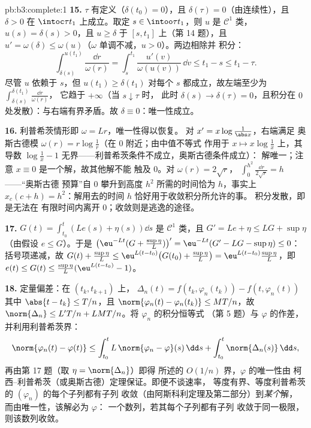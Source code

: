 \begin{solution}{pb:b3:complete:1}
\textbf{15.} $\tau$ 有定义（$\delta(t_0) = 0$），且
$\delta(\tau) = 0$（由连续性），且 $\delta > 0$ 在
$\intoc\tau{t_1}$ 上成立。取定 $s \in \intoo\tau{t_1}$，则 $u$
是 $\mathcal C^1$ 类，$u(s) = \delta(s) > 0$，且 $u \geq \delta$ 于
$[s, t_1]$ 上（第 14 题），且 $u' = \omega(\delta) \leq
\omega(u)$（$\omega$ 单调不减，$u > 0$）。两边相除并
积分：
\[
\int_{\delta(s)}^{u(t_1)}\frac{\dd r}{\omega(r)}
= \int_s^{t_1}\frac{u'(v)}{\omega(u(v))}\,\dd v \leq t_1 - s
\leq t_1 - \tau .
\]
尽管 $u$ 依赖于 $s$，但 $u(t_1) \geq
\delta(t_1)$ 对每个 $s$ 都成立，故左端至少为
$\int_{\delta(s)}^{\delta(t_1)}\frac{\dd r}{\omega(r)}$，
它趋于 $+\infty$（当 $s \downarrow \tau$ 时，
此时 $\delta(s) \to \delta(\tau) = 0$，且积分在
$0$ 处发散）：与右端有界矛盾。故
$\delta \equiv 0$：唯一性成立。

\textbf{16.} 利普希茨情形即 $\omega = Lr$，唯一性得以恢复。
对 $x' = x\log\frac1{\abs x}$，右端满足
奥斯古德模 $\omega(r) = r\log\frac1r$（在 $0$ 附近；由中值不等式
作用于 $x \mapsto x\log\frac1x$ 上，其导数
$\log\frac1x - 1$ 无界——利普希茨条件不成立，奥斯古德条件成立）：
解唯一；注意 $x \equiv 0$ 是一个解，故其他解不能
触及 $0$。对 $\omega(r) = 2\sqrt r$，
$\int_0^{h^2}\frac{\dd r}{2\sqrt r} = h$——“奥斯古德
预算”自 $0$ 攀升到高度 $h^2$ 所需的时间恰为
$h$，事实上 $x_c(c + h) = h^2$：解用去的时间
$h$ 恰好用于收敛积分所允许的事。
积分发散，即是无法在
有限时间内离开 $0$；收敛则是逃逸的途径。

\textbf{17.} $G(t) = \int_{t_0}^t(Le(s) + \eta(s))\dd s$ 是
$\mathcal C^1$ 类，且 $G' = Le + \eta \leq LG + \sup\eta$
（由假设 $e \leq G$）。于是 $\bigl(\eu^{-Lt}(G +
\tfrac{\sup\eta}L)\bigr)' = \eu^{-Lt}(G' - LG - \sup\eta)
\leq 0$：括号项递减，故 $G(t) + \frac{\sup\eta}L
\leq \eu^{L(t - t_0)}\bigl(G(t_0) + \frac{\sup\eta}L\bigr) =
\eu^{L(t-t_0)}\frac{\sup\eta}L$，即 $e(t) \leq G(t) \leq
\frac{\sup\eta}L(\eu^{L(t-t_0)} - 1)$。

\textbf{18.} 定量偏差：在 $(t_k, t_{k+1})$ 上，
$\Delta_n(t) = f(t_k, \varphi_n(t_k)) - f(t, \varphi_n(t))$
其中 $\abs{t - t_k} \leq T/n$，且 $\norm{\varphi_n(t) -
\varphi_n(t_k)} \leq MT/n$，故 $\norm{\Delta_n} \leq L'T/n +
LMT/n$。将 $\varphi_n$ 的积分恒等式
（第 5 题）与 $\varphi$ 的作差，并利用利普希茨界：
\[
\norm{\varphi_n(t) - \varphi(t)} \leq
\int_{t_0}^t L\,\norm{\varphi_n - \varphi}(s)\,\dd s +
\int_{t_0}^t\norm{\Delta_n(s)}\,\dd s,
\]
再由第 17 题（取 $\eta = \norm{\Delta_n}$）即得
所述的 $O(1/n)$ 界，$\varphi$ 的唯一性由
柯西--利普希茨（或奥斯古德）定理保证。即便不谈速率，
等度有界、等度利普希茨的 $(\varphi_n)$ 的每个子列都有子列
收敛（由阿斯科利定理及第二部分）到\emph{某个}解，
而由唯一性，该解必为 $\varphi$：
一个数列，若其每个子列都有子列
收敛于同一极限，则该数列收敛。


\end{solution}
